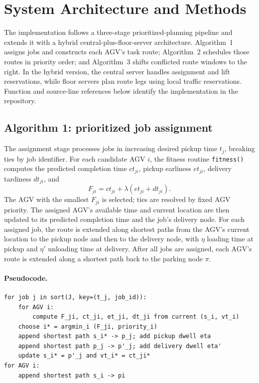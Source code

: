 \documentclass[11pt]{article}
\begin{document}
\section{System Architecture and Methods}
\label{sec:architecture-methods}

The implementation follows a three-stage prioritized-planning pipeline and
extends it with a hybrid central-plus-floor-server architecture. Algorithm~1
assigns jobs and constructs each AGV's task route; Algorithm~2 schedules those
routes in priority order; and Algorithm~3 shifts conflicted route windows to
the right. In the hybrid version, the central server handles assignment and
lift reservations, while floor servers plan route legs using local traffic
reservations. Function and source-line references below identify the
implementation in the repository.

\subsection{Algorithm 1: prioritized job assignment}

The assignment stage processes jobs in increasing desired pickup time
$t_j$, breaking ties by job identifier. For each candidate AGV $i$, the
fitness routine \texttt{fitness()} computes the predicted completion time
$ct_{ji}$, pickup earliness $et_{ji}$, delivery tardiness $dt_{ji}$, and
\[
  F_{ji}=ct_{ji}+\lambda(et_{ji}+dt_{ji}).
\]
The AGV with the smallest $F_{ji}$ is selected; ties are resolved by fixed AGV
priority. The assigned AGV's available time and current location are then
updated to its predicted completion time and the job's delivery node. For
each assigned job, the route is extended along shortest paths from the AGV's
current location to the pickup node and then to the delivery node, with
$\eta$ loading time at pickup and $\eta'$ unloading time at delivery. After
all jobs are assigned, each AGV's route is extended along a shortest path
back to the parking node $\pi$.

\paragraph{Pseudocode.}
\begin{verbatim}
for job j in sort(J, key=(t_j, job_id)):
    for AGV i:
        compute F_ji, ct_ji, et_ji, dt_ji from current (s_i, vt_i)
    choose i* = argmin_i (F_ji, priority_i)
    append shortest path s_i* -> p_j; add pickup dwell eta
    append shortest path p_j -> p'_j; add delivery dwell eta'
    update s_i* = p'_j and vt_i* = ct_ji*
for AGV i:
    append shortest path s_i -> pi
\end{verbatim}
\end{document}
